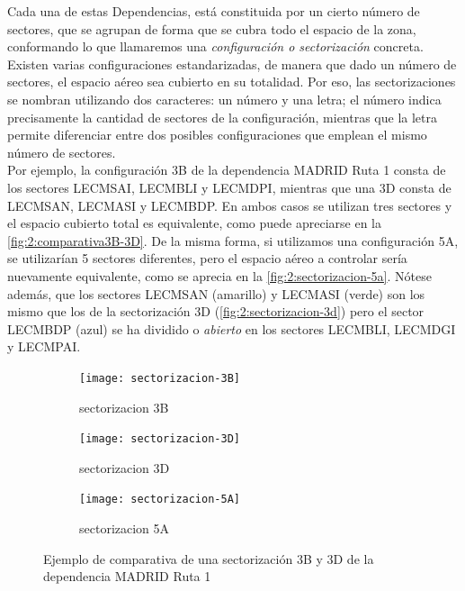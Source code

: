 Cada una de estas Dependencias, está constituida por un cierto número de sectores, que se agrupan de forma que se cubra
todo el espacio de la zona, conformando lo que llamaremos una \textit{configuración o sectorización} concreta.
Existen varias configuraciones estandarizadas, de manera que dado un número de sectores, el espacio aéreo sea cubierto en su totalidad.
Por eso, las sectorizaciones se nombran utilizando dos caracteres: un número y una letra; el número indica precisamente
la cantidad de sectores de la configuración, mientras que la letra permite diferenciar entre dos posibles configuraciones
que emplean el mismo número de sectores.
\\

Por ejemplo, la configuración 3B de la dependencia MADRID Ruta 1 consta de los sectores LECMSAI, LECMBLI y LECMDPI,
mientras que una 3D consta de LECMSAN, LECMASI y LECMBDP. En ambos casos se utilizan tres sectores y el espacio cubierto
total es equivalente, como puede apreciarse en la \autoref{fig:2:comparativa3B-3D}.
De la misma forma, si utilizamos una configuración 5A, se utilizarían 5 sectores diferentes, pero el espacio aéreo a
controlar sería nuevamente equivalente, como se aprecia en la \autoref{fig:2:sectorizacion-5a}.
Nótese además, que los sectores LECMSAN (amarillo) y LECMASI (verde) son los mismo que los de la sectorización 3D (\autoref{fig:2:sectorizacion-3d})
pero el sector LECMBDP (azul) se ha dividido o \textit{abierto} en los sectores LECMBLI, LECMDGI y LECMPAI.
\\

\begin{figure}[htbp]
    \centering
    \begin{subfigure}{\linewidth}
        \centering
        \texttt{[image: sectorizacion-3B]}
        \caption{sectorizacion 3B\linebreak}
    \end{subfigure}

    \begin{subfigure}{\linewidth}
        \centering
        \texttt{[image: sectorizacion-3D]}
        \caption{sectorizacion 3D\linebreak}
        \label{fig:2:sectorizacion-3d}
    \end{subfigure}

    \begin{subfigure}{\linewidth}
        \centering
        \texttt{[image: sectorizacion-5A]}
        \caption{sectorizacion 5A}
        \label{fig:2:sectorizacion-5a}
    \end{subfigure}

    \caption{Ejemplo de comparativa de una sectorización 3B y 3D de la dependencia MADRID Ruta 1}
    \label{fig:2:comparativa3B-3D}
\end{figure}


